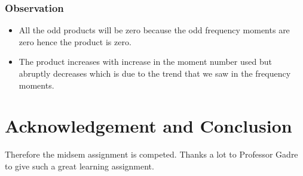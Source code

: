 \documentclass{article}
\begin{document}
\subsubsection{Observation}
\begin{itemize}
\item All the odd products will be zero because the odd frequency moments are zero hence the product is zero.
\item The product increases with increase in the moment number used but abruptly decreases which is due to the trend that we saw in the frequency moments.

\end{itemize}


\section{Acknowledgement and Conclusion}
Therefore the midsem assignment is competed. Thanks a lot to Professor Gadre to give such a great learning assignment.
\end{document}
